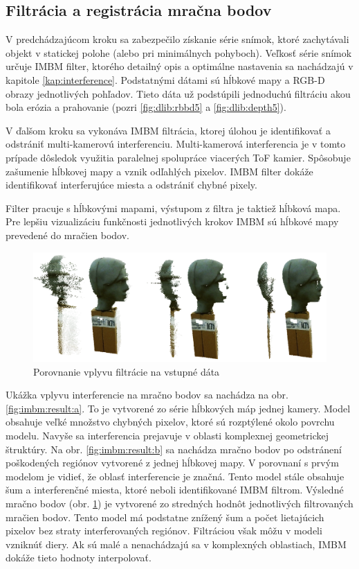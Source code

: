   

\subsection{Filtrácia a registrácia mračna bodov}
\label{sec:filtration}
V predchádzajúcom kroku sa zabezpečilo získanie série snímok, ktoré zachytávali objekt v statickej polohe (alebo pri minimálnych pohyboch). Veľkosť série snímok určuje IMBM filter, ktorého detailný opis a optimálne nastavenia sa nachádzajú v kapitole \ref{kap:interference}. Podstatnými dátami sú hĺbkové mapy a RGB-D obrazy jednotlivých pohľadov. Tieto dáta už podstúpili jednoduchú filtráciu akou bola erózia a prahovanie (pozri \ref{fig:dlib:rbbd5} a \ref{fig:dlib:depth5}). 

V ďalšom kroku sa vykonáva IMBM filtrácia, ktorej úlohou je identifikovať a odstrániť multi-kamerovú interferenciu. Multi-kamerová interferencia je v tomto prípade dôsledok využitia paralelnej spolupráce viacerých ToF kamier. Spôsobuje zašumenie hĺbkovej mapy a vznik odľahlých pixelov. IMBM filter dokáže identifikovať interferujúce miesta a odstrániť chybné pixely. 

Filter pracuje s hĺbkovými mapami, výstupom z filtra je taktiež hĺbková mapa. Pre lepšiu vizualizáciu funkčnosti jednotlivých krokov IMBM sú hĺbkové mapy prevedené do mračien bodov.  

\begin{figure}[H]
	\centering
	\includegraphics[width=\textwidth]{figures/prepared_models.png}
	\caption{Porovnanie vplyvu filtrácie na vstupné dáta}
	\label{fig:imbm:result:a}
	\label{fig:imbm:result:b}
	\label{fig:imbm:result:c}
\end{figure}

Ukážka vplyvu interferencie na mračno bodov sa nachádza na obr. \ref{fig:imbm:result:a}. To je vytvorené zo série hĺbkových máp jednej kamery. Model obsahuje veľké množstvo chybných pixelov, ktoré sú rozptýlené okolo povrchu modelu. Navyše sa interferencia prejavuje v oblasti komplexnej geometrickej štruktúry. 
Na obr. \ref{fig:imbm:result:b} sa nachádza mračno bodov po odstránení poškodených regiónov vytvorené z jednej hĺbkovej mapy. V porovnaní s prvým modelom je vidieť, že oblasť interferencie je značná. Tento model stále obsahuje šum a interferenčné miesta, ktoré neboli identifikované IMBM filtrom.  
Výsledné mračno bodov (obr. \ref{fig:imbm:result:c}) je vytvorené zo stredných hodnôt jednotlivých filtrovaných mračien bodov. Tento model má podstatne znížený šum a počet lietajúcich pixelov bez straty interferovaných regiónov. Filtráciou však môžu v modeli vzniknúť diery. Ak sú malé a nenachádzajú sa v komplexných oblastiach, IMBM dokáže tieto hodnoty interpolovať. 

